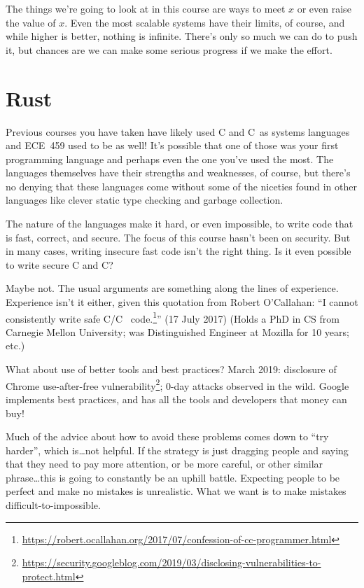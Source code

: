 \documentclass[a4paper]{report}
\newcommand{\CPP}{C\nolinebreak\hspace{-.05em}\raisebox{.4ex}{\tiny\bf +}\nolinebreak\hspace{-.10em}\raisebox{.4ex}{\tiny\bf +}}
\def\CPP{{C\nolinebreak[4]\hspace{-.05em}\raisebox{.4ex}{\tiny\bf ++}}}
\begin{document}
The things we're going to look at in this course are ways to meet $x$ or even raise the value of $x$. Even the most scalable systems have their limits, of course, and while higher is better, nothing is infinite. There's only so much we can do to push it, but chances are we can make some serious progress if we make the effort.

\section*{Rust}

Previous courses you have taken have likely used C and \CPP~as systems languages and ECE~459 used to be as well! It's possible that one of those was your first programming language and perhaps even the one you've used the most. The languages themselves have their strengths and weaknesses, of course, but there's no denying that these languages come without some of the niceties found in other languages like clever static type checking and garbage collection.


The nature of the languages make it hard, or even impossible, to write code that is fast, correct, and secure. The focus of this course hasn't been on security. But in many cases, writing insecure fast code isn't the right thing. Is it even possible to write secure C and \CPP?

Maybe not. The usual arguments are something along the lines of experience. Experience isn't it either, given this quotation from Robert O'Callahan: ``I cannot consistently write safe C/\CPP~ code.\footnote{\url{https://robert.ocallahan.org/2017/07/confession-of-cc-programmer.html}}'' (17 July 2017) (Holds a PhD in CS from Carnegie Mellon University; was Distinguished Engineer at Mozilla for 10 years; etc.)

What about use of better tools and best practices? March 2019: disclosure of Chrome use-after-free vulnerability\footnote{\url{https://security.googleblog.com/2019/03/disclosing-vulnerabilities-to-protect.html}}; 0-day attacks
observed in the wild. Google implements best practices, and has all the tools and developers that
money can buy!

Much of the advice about how to avoid these problems comes down to ``try harder'', which is\ldots not helpful. If the strategy is just dragging people and saying that they need to pay more attention, or be more careful, or other similar phrase\ldots this is going to constantly be an uphill battle. Expecting people to be perfect and make no mistakes is unrealistic. What we want is to make mistakes difficult-to-impossible.
\end{document}
